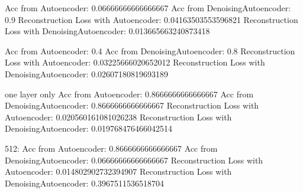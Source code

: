 Acc from Autoencoder: 0.06666666666666667
Acc from DenoisingAutoencoder: 0.9
Reconstruction Loss with Autoencoder: 0.04163503553596821
Reconstruction Loss with DenoisingAutoencoder: 0.013665663240873418

Acc from Autoencoder: 0.4
Acc from DenoisingAutoencoder: 0.8
Reconstruction Loss with Autoencoder: 0.03225666020652012
Reconstruction Loss with DenoisingAutoencoder: 0.02607180819693189

one layer only
Acc from Autoencoder: 0.8666666666666667
Acc from DenoisingAutoencoder: 0.8666666666666667
Reconstruction Loss with Autoencoder: 0.020560161081026238
Reconstruction Loss with DenoisingAutoencoder: 0.019768476466042514

512:
Acc from Autoencoder: 0.8666666666666667
Acc from DenoisingAutoencoder: 0.06666666666666667
Reconstruction Loss with Autoencoder: 0.014802902732394907
Reconstruction Loss with DenoisingAutoencoder: 0.3967511536518704
